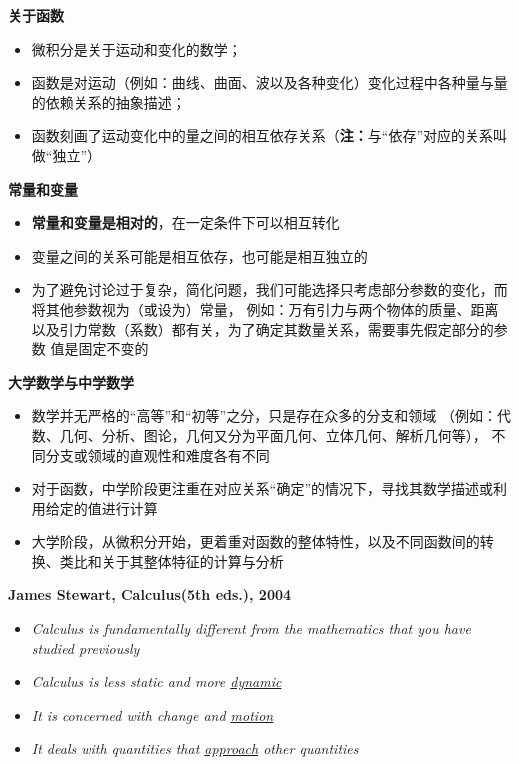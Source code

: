	\begin{shaded}
		{\bf 关于函数}
		\begin{itemize}
  		  \setlength{\itemindent}{1cm}
		  \item 微积分是关于运动和变化的数学；
		  \item 函数是对运动（例如：曲线、曲面、波以及各种变化）变化过程中各种量与量的依赖关系的抽象描述；
		  \item 函数刻画了运动变化中的量之间的相互依存关系（{\bf 注：}与“依存”对应的关系叫做“独立”）
		\end{itemize}
		
		{\bf 常量和变量}
		\begin{itemize}
  		  \setlength{\itemindent}{1cm}
		  \item {\bf 常量和变量是相对的}，在一定条件下可以相互转化
		  \item 变量之间的关系可能是相互依存，也可能是相互独立的
		  \item 为了避免讨论过于复杂，简化问题，我们可能选择只考虑部分参数的变化，而将其他参数视为（或设为）常量，
		  例如：万有引力与两个物体的质量、距离以及引力常数（系数）都有关，为了确定其数量关系，需要事先假定部分的参数
		  值是固定不变的
		\end{itemize}
		
		{\bf 大学数学与中学数学}
		\begin{itemize}
  		  \setlength{\itemindent}{1cm}
		  \item 数学并无严格的“高等”和“初等”之分，只是存在众多的分支和领域
		  （例如：代数、几何、分析、图论，几何又分为平面几何、立体几何、解析几何等），
		  不同分支或领域的直观性和难度各有不同
		  \item 对于函数，中学阶段更注重在对应关系“确定”的情况下，寻找其数学描述或利用给定的值进行计算
		  \item 大学阶段，从微积分开始，更着重对函数的整体特性，以及不同函数间的转换、类比和关于其整体特征的计算与分析
		\end{itemize}
		
		 {\bf James Stewart, Calculus(5th eds.), 2004}
		  \begin{itemize}
  		    \setlength{\itemindent}{1cm}
		    \item {\it Calculus is fundamentally different from the mathematics that
		    you have studied previously}
		    \item {\it Calculus is less static and more \underline{dynamic}}
		    \item {\it It is concerned with change and \underline{motion}}
		    \item {\it It deals with quantities that \underline{approach} other
		    quantities}%
		  \end{itemize}
	\end{shaded}

